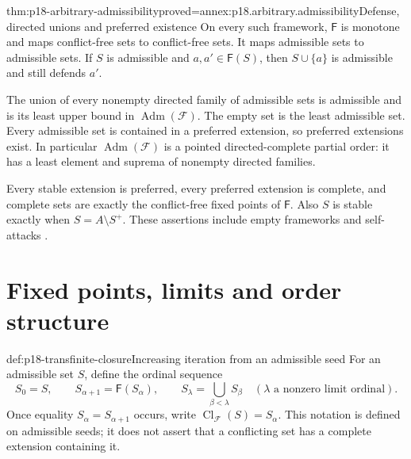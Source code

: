 \begin{hbtheorem}{thm:p18-arbitrary-admissibility}{proved=annex:p18.arbitrary.admissibility}{Defense, directed unions and preferred existence}
On every such framework, \(\mathsf F\) is monotone and maps
conflict-free sets to conflict-free sets. It maps admissible
sets to admissible sets. If \(S\) is admissible and
\(a,a'\in\mathsf F(S)\), then \(S\cup\{a\}\) is admissible
and still defends \(a'\).

The union of every nonempty directed family of admissible
sets is admissible and is its least upper bound in
\(\operatorname{Adm}(\mathcal F)\). The empty set is the
least admissible set. Every admissible set is contained
in a preferred extension, so preferred extensions exist.
In particular \(\operatorname{Adm}(\mathcal F)\) is a
pointed directed-complete partial order: it has a
least element and suprema of nonempty directed families.

Every stable extension is preferred, every preferred
extension is complete, and complete sets are exactly
the conflict-free fixed points of \(\mathsf F\).
Also \(S\) is stable exactly when \(S=A\setminus S^+\).
These assertions include empty frameworks and self-attacks
\cite[lemmas~10, 14--15, 18--19, 24; theorem~11]{Dung1995}.
\end{hbtheorem}

\section{Fixed points, limits and order structure}

\begin{hbdefinition}{def:p18-transfinite-closure}{Increasing iteration from an admissible seed}
For an admissible set \(S\), define the ordinal sequence
\[
 S_0=S,\qquad S_{\alpha+1}=\mathsf F(S_\alpha),\qquad
 S_\lambda=\bigcup_{\beta<\lambda}S_\beta
       \quad(\lambda\text{ a nonzero limit ordinal}).
\]
Once equality \(S_\alpha=S_{\alpha+1}\) occurs, write
\(\operatorname{Cl}_{\mathcal F}(S)=S_\alpha\).
This notation is defined on admissible seeds; it does
not assert that a conflicting set has a complete
extension containing it.
\end{hbdefinition}


